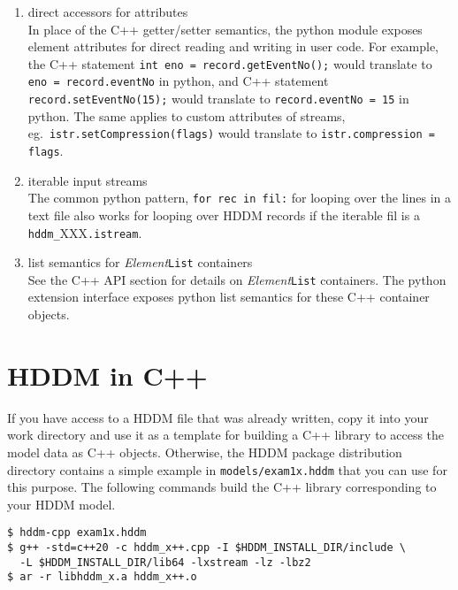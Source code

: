 \documentclass{revtex4}
\begin{document}
\begin{enumerate}
\item direct accessors for attributes\\
In place of the C++ getter/setter semantics, the python module exposes
element attributes for direct reading and writing in user code. For
example, the C++ statement \texttt{int eno = record.getEventNo();} 
would translate to \texttt{eno = record.eventNo} in python, and C++
statement \texttt{record.setEventNo(15);} would translate to
\texttt{record.eventNo = 15} in python. The same applies to custom
attributes of streams, eg.\ \texttt{istr.setCompression(flags)}
would translate to \texttt{istr.compression = flags}.
\item iterable input streams\\
The common python pattern, \texttt{for rec in fil:} for looping over
the lines in a text file also works for looping over HDDM records if
the iterable fil is a \texttt{hddm\_}XXX\texttt{.istream}.
\item list semantics for {\em Element}\texttt{List} containers\\
See the C++ API section for details on {\em Element}\texttt{List}
containers. The python extension interface exposes python list
semantics for these C++ container objects.
\end{enumerate}

\section{HDDM in C++}

If you have access to a HDDM file that was already written, copy it into your
work directory and use it as a template for building a C++ library to access
the model data as C++ objects. Otherwise, the HDDM package distribution
directory contains a simple example in \texttt{models/exam1x.hddm} that you
can use for this purpose. The following commands build the C++ library
corresponding to your HDDM model.

\vspace{0.5cm}
\begin{minipage}{12cm}
\begin{verbatim}
$ hddm-cpp exam1x.hddm
$ g++ -std=c++20 -c hddm_x++.cpp -I $HDDM_INSTALL_DIR/include \
  -L $HDDM_INSTALL_DIR/lib64 -lxstream -lz -lbz2
$ ar -r libhddm_x.a hddm_x++.o
\end{verbatim}
\end{minipage}
\vspace{0.5cm}
\end{document}
